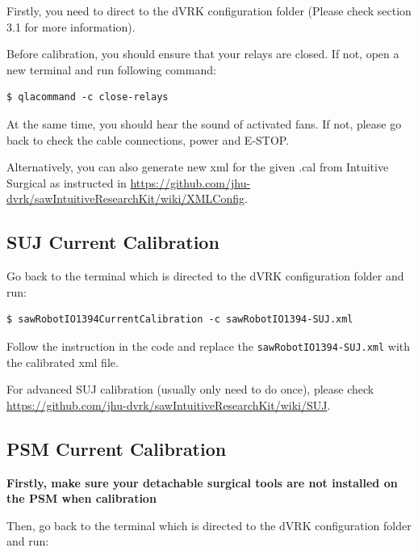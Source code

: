 
Firstly, you need to direct to the dVRK configuration folder (Please check section 3.1 for more information).


Before calibration, you should ensure that your relays are closed. If not, open a new terminal and run following command:

\begin{verbatim}
$ qlacommand -c close-relays
\end{verbatim}

At the same time, you should hear the sound of activated fans. If not, please go back to check the cable connections, power and E-STOP.

Alternatively, you can also generate new xml for the given .cal from Intuitive Surgical as instructed in \url{https://github.com/jhu-dvrk/sawIntuitiveResearchKit/wiki/XMLConfig}.

\subsection{SUJ Current Calibration}

Go back to the terminal which is directed to the dVRK configuration folder and run:

\begin{verbatim}
$ sawRobotIO1394CurrentCalibration -c sawRobotIO1394-SUJ.xml
\end{verbatim}

Follow the instruction in the code and replace the \texttt{sawRobotIO1394-SUJ.xml} with the calibrated xml file.

For advanced SUJ calibration (usually only need to do once), please check \url{https://github.com/jhu-dvrk/sawIntuitiveResearchKit/wiki/SUJ}.

\subsection{PSM Current Calibration}

\textbf{Firstly, make sure your detachable surgical tools are not installed on the PSM when calibration}

Then, go back to the terminal which is directed to the dVRK configuration folder and run:


